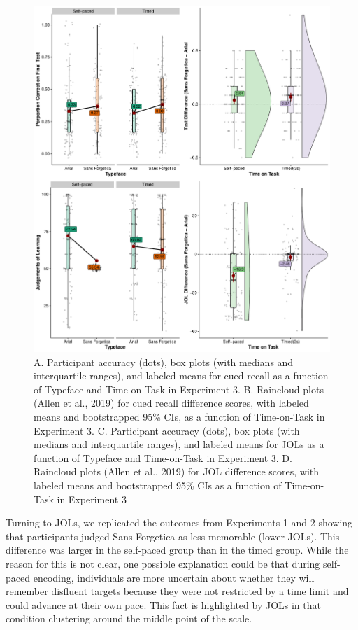 \documentclass[
  english,
  jou]{apa7}
\begin{document}
\begin{figure}

{\centering \includegraphics{Testing_Expectancy_SF_RR_files/figure-latex/unnamed-chunk-74-1} 

}

\caption{A. Participant accuracy (dots), box plots (with medians and interquartile ranges), and labeled means for cued recall as a function of Typeface and Time-on-Task in Experiment 3. B. Raincloud plots (Allen et al., 2019) for cued recall difference scores, with labeled means and bootstrapped 95\% CIs, as a function of Time-on-Task in Experiment 3. C. Participant accuracy (dots), box plots (with medians and interquartile ranges), and labeled means for JOLs as a function of Typeface and Time-on-Task in Experiment 3. D. Raincloud plots (Allen et al., 2019) for JOL difference scores, with labeled means and bootstrapped 95\% CIs as a function of Time-on-Task in Experiment 3}\label{fig:unnamed-chunk-74}
\end{figure}

Turning to JOLs, we replicated the outcomes from Experiments 1 and 2 showing that participants judged Sans Forgetica as less memorable (lower JOLs). This difference was larger in the self-paced group than in the timed group. While the reason for this is not clear, one possible explanation could be that during self-paced encoding, individuals are more uncertain about whether they will remember disfluent targets because they were not restricted by a time limit and could advance at their own pace. This fact is highlighted by JOLs in that condition clustering around the middle point of the scale.
\end{document}
